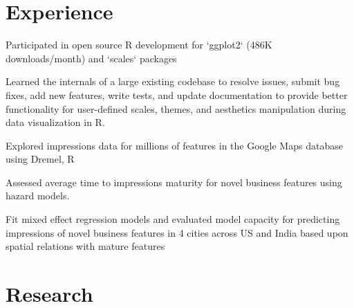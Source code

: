 \documentclass[]{deedy-resume-openfont}
\begin{document}
\begin{minipage}[t]{0.66\textwidth} 


\section{Experience}

\vspace{\topsep} %
\begin{tightemize}
\item Participated in open source R development for `ggplot2` (486K downloads/month) and `scales` packages
\item Learned the internals of a large existing codebase to resolve issues, submit bug fixes, add new features, write tests, and update documentation to provide better functionality for user-defined scales, themes, and aesthetics manipulation during data visualization in R. 
\end{tightemize}
\sectionsep

\begin{tightemize}
\item Explored impressions data for millions of features in the Google Maps database using Dremel, R
\item Assessed average time to impressions maturity for novel business features using hazard models.
\item Fit mixed effect regression models and evaluated model capacity for predicting impressions of novel business features in 4 cities across US and India based upon spatial relations with mature features
\end{tightemize}
\sectionsep


\section{Research}



\end{minipage}
\end{document}
